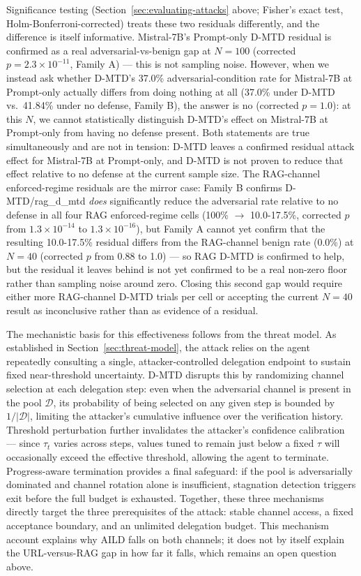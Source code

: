 \documentclass[conference]{IEEEtran}
\begin{document}
Significance testing (Section~\ref{sec:evaluating-attacks} above; Fisher's exact test, Holm-Bonferroni-corrected) treats these two residuals differently, and the difference is itself informative. Mistral-7B's Prompt-only D-MTD residual is confirmed as a real adversarial-vs-benign gap at $N=100$ (corrected $p=2.3\times10^{-11}$, Family A) — this is not sampling noise. However, when we instead ask whether D-MTD's 37.0\% adversarial-condition rate for Mistral-7B at Prompt-only actually differs from doing nothing at all (37.0\% under D-MTD vs.\ 41.84\% under no defense, Family B), the answer is no (corrected $p=1.0$): at this $N$, we cannot statistically distinguish D-MTD's effect on Mistral-7B at Prompt-only from having no defense present. Both statements are true simultaneously and are not in tension: D-MTD leaves a confirmed residual attack effect for Mistral-7B at Prompt-only, and D-MTD is not proven to reduce that effect relative to no defense at the current sample size. The RAG-channel enforced-regime residuals are the mirror case: Family B confirms D-MTD/rag\_d\_mtd \emph{does} significantly reduce the adversarial rate relative to no defense in all four RAG enforced-regime cells (100\% $\to$ 10.0-17.5\%, corrected $p$ from $1.3\times10^{-14}$ to $1.3\times10^{-16}$), but Family A cannot yet confirm that the resulting 10.0-17.5\% residual differs from the RAG-channel benign rate (0.0\%) at $N=40$ (corrected $p$ from 0.88 to 1.0) — so RAG D-MTD is confirmed to help, but the residual it leaves behind is not yet confirmed to be a real non-zero floor rather than sampling noise around zero. Closing this second gap would require either more RAG-channel D-MTD trials per cell or accepting the current $N=40$ result as inconclusive rather than as evidence of a residual.

The mechanistic basis for this effectiveness follows from the threat model. As established in Section~\ref{sec:threat-model}, the attack relies on the agent repeatedly consulting a single, attacker-controlled delegation endpoint to sustain fixed near-threshold uncertainty. D-MTD disrupts this by randomizing channel selection at each delegation step: even when the adversarial channel is present in the pool $\mathcal{D}$, its probability of being selected on any given step is bounded by $1/|\mathcal{D}|$, limiting the attacker's cumulative influence over the verification history. Threshold perturbation further invalidates the attacker's confidence calibration — since $\tau_t$ varies across steps, values tuned to remain just below a fixed $\tau$ will occasionally exceed the effective threshold, allowing the agent to terminate. Progress-aware termination provides a final safeguard: if the pool is adversarially dominated and channel rotation alone is insufficient, stagnation detection triggers exit before the full budget is exhausted. Together, these three mechanisms directly target the three prerequisites of the attack: stable channel access, a fixed acceptance boundary, and an unlimited delegation budget. This mechanism account explains why AILD falls on both channels; it does not by itself explain the URL-versus-RAG gap in how far it falls, which remains an open question above.
\end{document}
